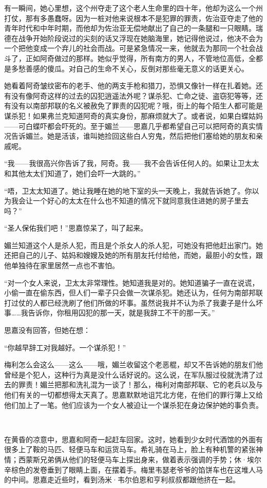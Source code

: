 \par 有一瞬间，她心里想，这个州夺走了这个老人生命里的四十年，他却为这么一个州打仗，那有多愚蠢呀。因为一桩对他来说根本不是犯罪的罪责，佐治亚夺走了他的青年时代和中年时期，而他却为佐治亚无偿地献出了自己的一条腿和一只眼睛。瑞德在战争开始阶段说过的尖刻的话又浮现在她脑海里，她记得他说过，他决不会为一个把他变成一个弃儿的社会而战。可是紧急情况一来，他就去为那同一个社会战斗了，正如阿奇做过的那样。她似乎觉得，所有南方的男人，不管地位高低，全都是多愁善感的傻瓜。对自己的生命不关心，反倒对那些毫无意义的话更关心。
\par 她看着阿奇皱纹密布的老手、他的两支手枪和猎刀，恐惧又像针一样在扎着她。还有没有像阿奇这样的过去的囚犯逍遥法外呢？谋杀犯、亡命之徒、盗窃犯等等，还有没有以南部邦联的名义被赦免了罪责的囚犯呢？哦，街上的每个陌生人都可能是谋杀犯！如果弗兰克知道阿奇的真实身份，那麻烦就大了。或者说，如果白蝶姑妈——可白蝶吓都会吓死的。至于媚兰——思嘉几乎都希望自己可以把阿奇的真实情况告诉媚兰。她是活该，谁叫她捡回这些白人穷鬼，然后把他们塞给她的朋友和亲戚呢。
\par “我——我很高兴你告诉了我，阿奇。我——我不会告诉任何人的。如果让卫太太和其他太太们知道了，她们会吓一大跳的。”
\par “唔，卫太太知道了。她让我睡在她的地下室的头一天晚上，我就告诉她了。你以为我会让一个好心的太太在什么也不知道的情况下就同意我住进她的房子里去吗？”
\par “圣人保佑我们吧！”思嘉惊呆了，叫了起来。
\par 媚兰知道这个人是杀人犯，而且是个杀女人的杀人犯，可她没有把他赶出家门。她还把自己的儿子、姑妈和嫂嫂及她的所有朋友托付给他，而她，最胆小的女性，跟他单独待在家里居然一点也不害怕。
\par “对一个女人来说，卫太太非常理性。她知道我是对的。她知道骗子一直在说谎，小偷一直在偷东西，但人们一辈子只会做一次谋杀犯。她还认为，任何为南部邦联打过仗的人都已经洗刷了他们所做的坏事。虽然说我并不认为杀了我妻子是什么坏事……我告诉你，你租用囚犯的那一天，就是我辞工不干的那一天。”
\par 思嘉没有回答，但她在想：
\par “你越早辞工对我越好。一个谋杀犯！”
\par 梅利怎么会这么——这么——哦，媚兰收留这个老恶棍，却又不告诉她的朋友们他曾经是个犯人，这种行为真是没什么话好说的。这么说，在军队服过役就洗清了过去的罪责！媚兰把那和洗礼混为一谈了！那么，梅利对南部邦联、它的老兵以及与他们有关的一切都想得太天真了。思嘉默默地诅咒北方佬，在他们的罪行簿上又给他们加上了一笔。他们应该为一个女人被迫让一个谋杀犯在身边保护她的事负责。
\par  
\par 在黄昏的凉意中，思嘉和阿奇一起赶车回家。这时，她看到少女时代酒馆的外面有很多上了鞍的马匹、轻便马车和运货马车。希礼骑在马上，脸上有种机警的紧张神情；西蒙斯兄弟俩从他们的轻便马车上探出身来，做着表示强调的手势；休·埃尔辛棕色的发卷垂到了眼睛上面，在摆着手。梅里韦瑟老爷爷的馅饼车也在这堆人马的中间。思嘉走近些时，看到汤米·韦尔伯恩和亨利叔叔都跟他挤在一起。
